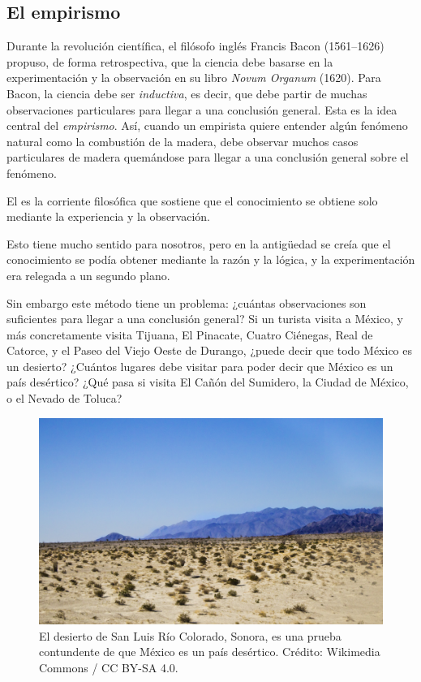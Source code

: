 \subsection*{El empirismo}
\label{sub:elemprismo}
Durante la revolución científica, el filósofo inglés %
{Francis Bacon} (1561--1626) propuso, de forma retrospectiva, que la ciencia
debe basarse en la experimentación y la observación en su libro \emph{Novum
    Organum} (1620).
Para Bacon, la ciencia debe ser \emph{inductiva}, es decir, que debe partir de
muchas observaciones particulares para llegar a una conclusión general.
Esta es la idea central del \emph{empirismo}.
Así, cuando un empirista quiere entender algún fenómeno natural como la
combustión de la madera, debe observar muchos casos particulares de madera
quemándose para llegar a una conclusión general sobre el fenómeno.

\begin{remember}
    \label{rem:empirismo}
    El  es la corriente filosófica que sostiene que el
    conocimiento se obtiene solo mediante la experiencia y la observación.
\end{remember}

Esto tiene mucho sentido para nosotros, pero en la antigüedad se creía que el
conocimiento se podía obtener mediante la razón y la lógica, y la
experimentación era relegada a un segundo plano.

Sin embargo este método tiene un problema: ¿cuántas observaciones son
suficientes para llegar a una conclusión general?
Si un turista visita a México, y más concretamente visita Tijuana, El Pinacate,
Cuatro Ciénegas, Real de Catorce, y el Paseo del Viejo Oeste de Durango, ¿puede
decir que todo México es un desierto?
¿Cuántos lugares debe visitar para poder decir que México es un país desértico?
¿Qué pasa si visita El Cañón del Sumidero, la Ciudad de México, o el Nevado de
Toluca?

\begin{figure}[ht]
    \centering
    \includegraphics[width=0.8\linewidth]{img/Desierto_de_San_Luis_Rio_Colorado}
    \caption{El desierto de San Luis Río Colorado, Sonora, es una prueba
        contundente de que México es un país desértico.
        Crédito: Wikimedia Commons / CC BY-SA 4.0.}
\end{figure}

